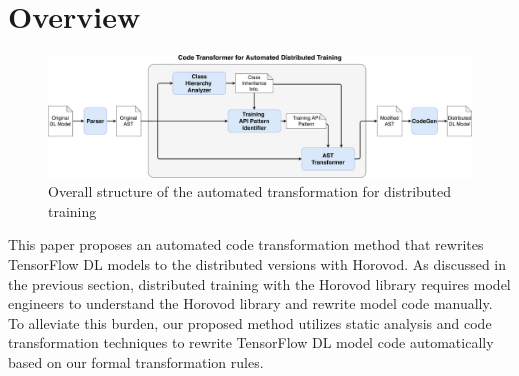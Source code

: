 \section{Overview}
 
\begin{figure}[ht!]
  \centering
  \includegraphics[width=\textwidth]{Fig6.eps}
  \caption{Overall structure of the 
  automated transformation for distributed training}
  \label{sysarch}
\end{figure}


\noindent
This paper proposes an automated code transformation method that rewrites
TensorFlow DL models to the distributed versions with Horovod.
As discussed in the previous section, distributed training with the Horovod
library requires model engineers to understand the Horovod library and rewrite
model code manually.
To alleviate this burden, our proposed method utilizes static analysis and code
transformation techniques to rewrite TensorFlow DL model code automatically
based on our formal transformation rules.


